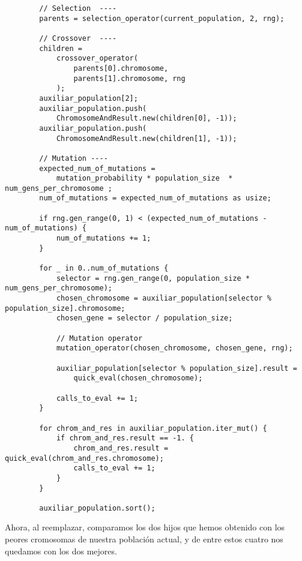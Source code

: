 \documentclass[size=a4, parskip=half, titlepage=false, toc=flat, toc=bib, 12pt]{scrartcl}
\begin{document}
\begin{verbatim}
        // Selection  ----
        parents = selection_operator(current_population, 2, rng);

        // Crossover  ----
        children =
            crossover_operator(
                parents[0].chromosome,
                parents[1].chromosome, rng
            );
        auxiliar_population[2];
        auxiliar_population.push(
            ChromosomeAndResult.new(children[0], -1));
        auxiliar_population.push(
            ChromosomeAndResult.new(children[1], -1));

        // Mutation ----
        expected_num_of_mutations =
            mutation_probability * population_size  * num_gens_per_chromosome ;
        num_of_mutations = expected_num_of_mutations as usize;

        if rng.gen_range(0, 1) < (expected_num_of_mutations - num_of_mutations) {
            num_of_mutations += 1;
        }

        for _ in 0..num_of_mutations {
            selector = rng.gen_range(0, population_size * num_gens_per_chromosome);
            chosen_chromosome = auxiliar_population[selector % population_size].chromosome;
            chosen_gene = selector / population_size;

            // Mutation operator
            mutation_operator(chosen_chromosome, chosen_gene, rng);

            auxiliar_population[selector % population_size].result =
                quick_eval(chosen_chromosome);

            calls_to_eval += 1;
        }

        for chrom_and_res in auxiliar_population.iter_mut() {
            if chrom_and_res.result == -1. {
                chrom_and_res.result = quick_eval(chrom_and_res.chromosome);
                calls_to_eval += 1;
            }
        }

        auxiliar_population.sort();
\end{verbatim}
Ahora, al reemplazar, comparamos los dos hijos que hemos obtenido con los peores cromosomas de nuestra población actual, y de entre estos cuatro nos quedamos con los dos mejores.
\end{document}
